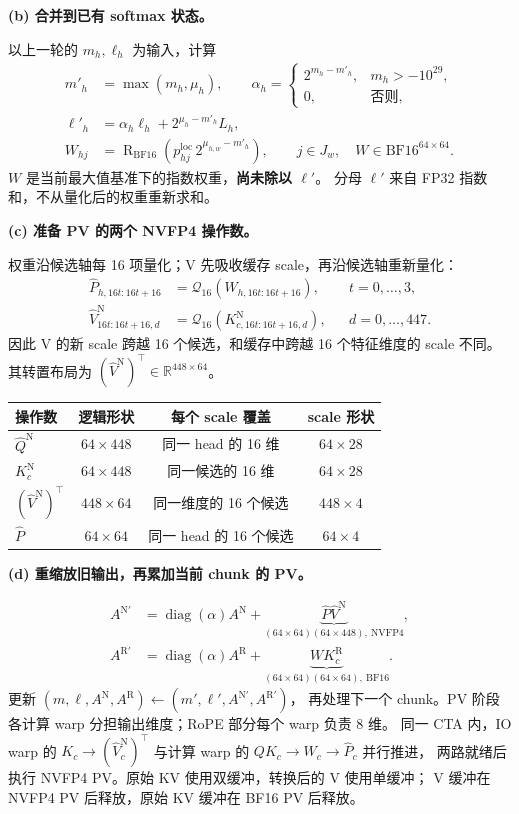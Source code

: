 \documentclass[UTF8,fontset=fandol,a4paper,10pt]{ctexart}
\newcommand{\BF}{\mathrm{BF16}}
\newcommand{\RN}{\operatorname{R}_{\BF}}
\newcommand{\Qnt}{\mathcal{Q}_{16}}
\newcommand{\N}{\mathrm{N}}
\newcommand{\R}{\mathrm{R}}
\newcommand{\diag}{\operatorname{diag}}
\begin{document}
\textbf{(b) 合并到已有 softmax 状态。}

以上一轮的 $m_h,\ell_h$ 为输入，计算
\begin{align*}
  m'_h&=\max(m_h,\mu_h),\qquad
  \alpha_h=\begin{cases}2^{m_h-m'_h},&m_h>-10^{29},\\0,&\text{否则},\end{cases}\\
  \ell'_h&=\alpha_h\ell_h+2^{\mu_h-m'_h}L_h,\\
  W_{hj}&=\RN\!\left(p^{\mathrm{loc}}_{hj}\,2^{\mu_{h,w}-m'_h}\right),
  \qquad j\in J_w,\quad W\in\BF^{64\times64}.
\end{align*}
$W$ 是当前最大值基准下的指数权重，\textbf{尚未除以 $\ell'$}。
分母 $\ell'$ 来自 FP32 指数和，不从量化后的权重重新求和。

\textbf{(c) 准备 PV 的两个 NVFP4 操作数。}

权重沿候选轴每 16 项量化；V 先吸收缓存 scale，再沿候选轴重新量化：
\begin{align*}
  \widehat P_{h,16t:16t+16}
    &=\Qnt(W_{h,16t:16t+16}),&&t=0,\ldots,3,\\
  \widehat V^{\N}_{16t:16t+16,d}
    &=\Qnt(K^{\N}_{c,16t:16t+16,d}),&&d=0,\ldots,447.
\end{align*}
因此 V 的新 scale 跨越 16 个候选，和缓存中跨越 16 个特征维度的 scale 不同。
其转置布局为 $(\widehat V^{\N})^\top\in\mathbb R^{448\times64}$。

\begin{center}
\begin{tabular}{lccc}
\toprule
操作数 & 逻辑形状 & 每个 scale 覆盖 & scale 形状\\
\midrule
$\widehat Q^{\N}$ & $64\times448$ & 同一 head 的 16 维 & $64\times28$\\
$K_c^{\N}$ & $64\times448$ & 同一候选的 16 维 & $64\times28$\\
$(\widehat V^{\N})^\top$ & $448\times64$ & 同一维度的 16 个候选 & $448\times4$\\
$\widehat P$ & $64\times64$ & 同一 head 的 16 个候选 & $64\times4$\\
\bottomrule
\end{tabular}
\end{center}

\textbf{(d) 重缩放旧输出，再累加当前 chunk 的 PV。}

\begin{align*}
  A^{\N\prime}
    &=\diag(\alpha)A^{\N}
      +\underbrace{\widehat P\widehat V^{\N}}_{(64\times64)(64\times448),\ \mathrm{NVFP4}},\\
  A^{\R\prime}
    &=\diag(\alpha)A^{\R}
      +\underbrace{W K_c^{\R}}_{(64\times64)(64\times64),\ \BF}.
\end{align*}
更新 $(m,\ell,A^{\N},A^{\R})\leftarrow(m',\ell',A^{\N\prime},A^{\R\prime})$，
再处理下一个 chunk。PV 阶段各计算 warp 分担输出维度；RoPE 部分每个 warp 负责 8 维。
同一 CTA 内，IO warp 的 $K_c\rightarrow(\widehat V_c^{\N})^\top$
与计算 warp 的 $QK_c\rightarrow W_c\rightarrow\widehat P_c$ 并行推进，
两路就绪后执行 NVFP4 PV。原始 KV 使用双缓冲，转换后的 V 使用单缓冲；
V 缓冲在 NVFP4 PV 后释放，原始 KV 缓冲在 BF16 PV 后释放。
\end{document}
